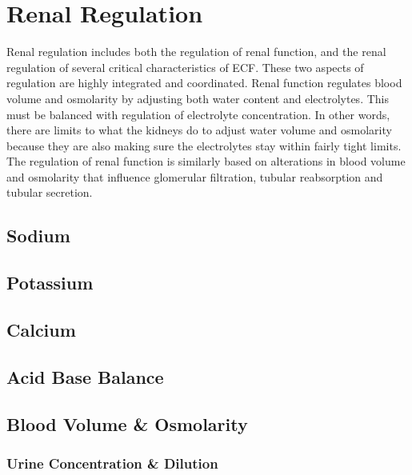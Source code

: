 \section{Renal Regulation}

Renal regulation includes both the regulation of renal function, and the renal regulation of several critical characteristics of ECF. These two aspects of regulation are highly integrated and coordinated. Renal function regulates blood volume and osmolarity by adjusting both water content and electrolytes. This must be balanced with regulation of electrolyte concentration. In other words, there are limits to what the kidneys do to adjust water volume and osmolarity because they are also making sure the electrolytes stay within fairly tight limits. The regulation of renal function is similarly based on alterations in blood volume and osmolarity that influence glomerular filtration, tubular reabsorption and tubular secretion. 




\subsection{Sodium}

\subsection{Potassium}

\subsection{Calcium}

\subsection{Acid Base Balance}

\subsection{Blood Volume \& Osmolarity}
\subsubsection{Urine Concentration \& Dilution}

